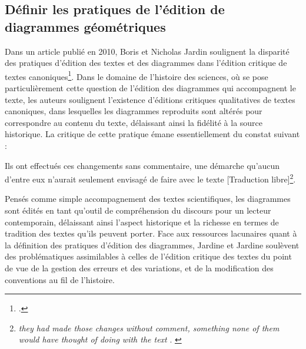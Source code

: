 
\subsection{Définir les pratiques de l'édition de diagrammes géométriques}
	Dans un article publié en 2010, Boris et Nicholas Jardin soulignent la disparité des pratiques d'édition des textes et des diagrammes dans l'édition critique de textes canoniques\footcite{jardineCriticalEditingEarlyModern2010}. Dans le domaine de l'histoire des sciences, où se pose particulièrement cette question de l'édition des diagrammes qui accompagnent le texte, les auteurs soulignent l'existence d'éditions critiques qualitatives de textes canoniques, dans lesquelles les diagrammes reproduits sont altérés pour correspondre au contenu du texte, délaissant ainsi la fidélité à la source historique. La critique de cette pratique émane essentiellement du constat suivant :
	
	\begin{displayquote}
		Ils ont effectués ces changements sans commentaire, une démarche qu'aucun d'entre eux n'aurait seulement envisagé de faire avec le texte [Traduction libre]\footnote{\textit{\og they had made those changes without comment, something none of them would have thought of doing with the text \fg}. \cite{jardineCriticalEditingEarlyModern2010}}.
	\end{displayquote}
    
    Pensés comme simple accompagnement des textes scientifiques, les diagrammes sont édités en tant qu'outil de compréhension du discours pour un lecteur contemporain, délaissant ainsi l'aspect historique et la richesse en termes de tradition des textes qu'ils peuvent porter. Face aux ressources lacunaires quant à la définition des pratiques d'édition des diagrammes, Jardine et Jardine soulèvent des problématiques assimilables à celles de l'édition critique des textes du point de vue de la gestion des erreurs et des variations, et de la modification des conventions au fil de l'histoire. 
    
